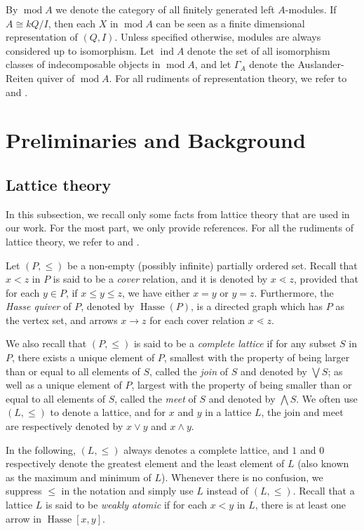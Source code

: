 \documentclass{amsart}
\newcommand{\nocontentsline}[3]{}
\newcommand\stoptoc{\let\addcontentsline\nocontentsline}
\theoremstyle{thmstyle}
\theoremstyle{exstyle}
\theoremstyle{defstyle}
\theoremstyle{remstyle}
\theoremstyle{remstyle}
\DeclareMathOperator*{\modu}{mod}
\DeclareMathOperator*{\ind}{ind}
\DeclareMathOperator*{\Hasse}{Hasse}
\begin{document}
By $\modu A$ we denote the category of all finitely generated left $A$-modules. If $A \cong kQ/I$, then each $X$ in $\modu A$ can be seen as a finite dimensional representation of $(Q,I)$. Unless specified otherwise, modules are always considered up to isomorphism. Let $\ind A$ denote the set of all isomorphism classes of indecomposable objects in $\modu A$, and let $\Gamma_A$ denote the Auslander-Reiten quiver of $\modu A$. For all rudiments of representation theory, we refer to \cite{ARS} and \cite{ASS}.

\section{Preliminaries and Background} \label{Section: Preliminaries and Background}

\stoptoc

\subsection{Lattice theory}\label{Subsection: Lattice theory}
In this subsection, we recall only some facts from lattice theory that are used in our work. For the most part, we only provide references. For all the rudiments of lattice theory, we refer to \cite{Gr} and \cite{DP}.

Let $(P,\leq)$ be a non-empty (possibly infinite) partially ordered set. Recall that $x<z$ in $P$ is said to be a \emph{cover} relation, and it is denoted by $x\lessdot z$, provided that for each $y\in P$, if $x\leq y \leq z$, we have either $x=y$ or $y=z$. Furthermore, the \emph{Hasse quiver} of $P$, denoted by $\Hasse(P)$, is a directed graph which has $P$ as the vertex set, and arrows $x\rightarrow z$ for each cover relation $x\lessdot z$. 

We also recall that $(P,\leq)$ is said to be a \emph{complete lattice} if for any subset $S$ in $P$, there exists a unique element of $P$, smallest with the property of being larger than or equal to all elements of $S$, called the \emph{join} of $S$ and denoted by $\bigvee S$; as well as a unique element of $P$, largest with the property of being smaller than or equal to all elements of $S$, called the \emph{meet} of $S$ and denoted by $\bigwedge S$. We often use $(L,\leq)$ to denote a lattice, and for $x$ and $y$ in a lattice $L$, the join and meet are respectively denoted by $x\vee y$ and $x\wedge y$. 

In the following, $(L,\leq)$ always denotes a complete lattice, and $1$ and $0$ respectively denote the greatest element and the least element of $L$ (also known as the maximum and minimum of $L$). Whenever there is no confusion, we suppress $\leq$ in the notation and simply use $L$ instead of $(L,\leq)$. Recall that a lattice $L$ is said to be \emph{weakly atomic} if for each $x<y$ in $L$, there is at least one arrow in $\Hasse[x,y]$.
\end{document}
